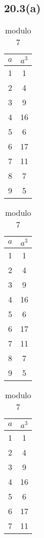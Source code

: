 \subsection{20.3(a)}

\begin{table}[H]
\centering
\begin{subtable}{.24\linewidth}
	\centering
	\begin{tabular}{c|c}
		$a$ & $a^3$ \\ \hline
		1   & 1  \\
		2   & 4  \\
		3   & 9  \\
		4   & 16 \\
		5   & 6  \\
		6   & 17 \\
		7   & 11 \\
		8   & 7  \\
		9   & 5
	\end{tabular}
	\caption*{modulo 5}
\end{subtable}
\begin{subtable}{.24\linewidth}
	\centering
	\begin{tabular}{c|c}
		$a$ & $a^3$ \\ \hline
		1   & 1  \\
		2   & 4  \\
		3   & 9  \\
		4   & 16 \\
		5   & 6  \\
		6   & 17 \\
		7   & 11 \\
		8   & 7  \\
		9   & 5
	\end{tabular}
	\caption*{modulo 7}
\end{subtable}
\begin{subtable}{.24\linewidth}
	\centering
	\begin{tabular}{c|c}
		$a$ & $a^3$ \\ \hline
		1   & 1  \\
		2   & 4  \\
		3   & 9  \\
		4   & 16 \\
		5   & 6  \\
		6   & 17 \\
		7   & 11 \\

\end{tabular}
\end{subtable}
\end{table}
